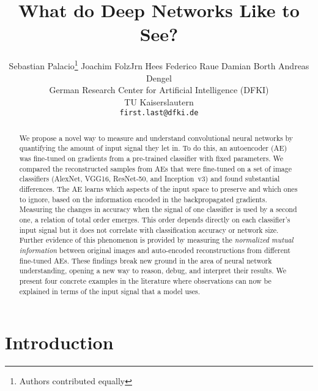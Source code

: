 \documentclass[10pt,twocolumn,a4paper]{article}
\begin{document}
\title{What do Deep Networks Like to See?}

\author{Sebastian Palacio\thanks{Authors contributed equally} \quad Joachim Folz\footnotemark[1] \quad Jrn Hees \quad Federico Raue \quad Damian Borth \quad Andreas Dengel \\
German Research Center for Artificial Intelligence (DFKI)\\
TU Kaiserslautern \\
\texttt{first.last@dfki.de}}

\maketitle

\begin{abstract}
	We propose a novel way to measure and understand convolutional neural networks by quantifying the amount of input signal they let in.
	To do this, an autoencoder (AE) was fine-tuned on gradients from a pre-trained classifier with fixed parameters.
	We compared the reconstructed samples from AEs that were fine-tuned on a set of image classifiers (AlexNet, VGG16, ResNet-50, and Inception~v3) and found substantial differences.
	The AE learns which aspects of the input space to preserve and which ones to ignore, based on the information encoded in the backpropagated gradients.
	Measuring the changes in accuracy when the signal of one classifier is used by a second one, a relation of total order emerges.
	This order depends directly on each classifier's input signal but it does not correlate with classification accuracy or network size.
	Further evidence of this phenomenon is provided by measuring the \textit{normalized mutual information} between original images and auto-encoded reconstructions from different fine-tuned AEs.
	These findings break new ground in the area of neural network understanding, opening a new way to reason, debug, and interpret their results.
	We present four concrete examples in the literature where observations can now be explained in terms of the input signal that a model uses.
\end{abstract}


\section{Introduction}
\end{document}
